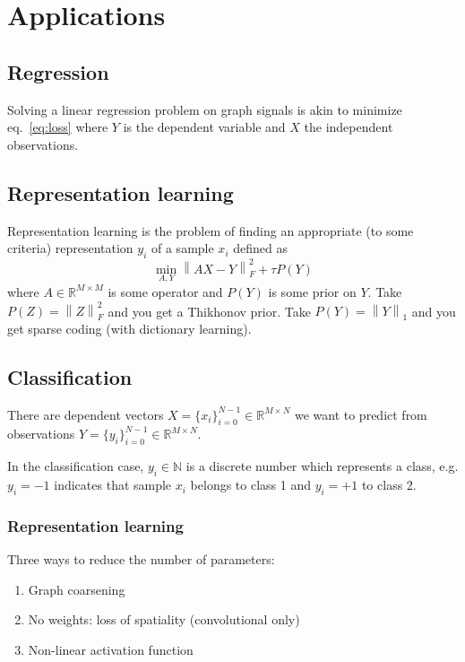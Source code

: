\documentclass{article}
\newcommand{\R}{\mathbb{R}}
\newcommand{\N}{\mathbb{N}}
\newcommand{\norm}[1]{\left\| #1 \right\|}
\begin{document}
\section{Applications}\label{applications}

\subsection{Regression}\label{regression}

Solving a linear regression problem on graph signals is akin to minimize
eq.~\ref{eq:loss} where \(Y\) is the dependent variable and \(X\) the
independent observations.

\subsection{Representation learning}\label{representation-learning}

Representation learning is the problem of finding an appropriate (to
some criteria) representation \(y_i\) of a sample \(x_i\) defined as
\[ \min_{A,Y} \norm{ AX - Y }_F^2 + \tau P(Y) \] where
\(A \in \R^{M \times M}\) is some operator and \(P(Y)\) is some prior on
\(Y\). Take \(P(Z)=\norm{Z}_F^2\) and you get a Thikhonov prior. Take
\(P(Y) = \norm{Y}_1\) and you get sparse coding (with dictionary
learning).

\subsection{Classification}\label{classification}

There are dependent vectors
\(X = \{x_i\}_{i=0}^{N-1} \in \R^{M \times N}\) we want to predict from
observations \(Y = \{y_i\}_{i=0}^{N-1} \in \R^{M \times N}\).

In the classification case, \(y_i \in \N\) is a discrete number which
represents a class, e.g. \(y_i=-1\) indicates that sample \(x_i\)
belongs to class 1 and \(y_i=+1\) to class 2.

\subsubsection{Representation learning}\label{representation-learning-1}

Three ways to reduce the number of parameters:

\begin{enumerate}
\def\labelenumi{\arabic{enumi}.}
\item
  Graph coarsening
\item
  No weights: loss of spatiality (convolutional only)
\item
  Non-linear activation function
\end{enumerate}
\end{document}
